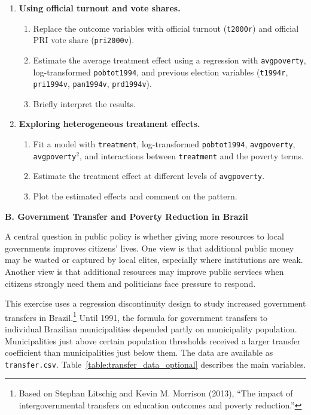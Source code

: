 \documentclass[12pt]{article}
\begin{document}
\begin{enumerate}
    \item \textbf{Using official turnout and vote shares.}
    \begin{enumerate}[label=(\alph*)]
        \item Replace the outcome variables with official turnout (\texttt{t2000r}) and official PRI vote share (\texttt{pri2000v}).
        \item Estimate the average treatment effect using a regression with \texttt{avgpoverty}, log-transformed \texttt{pobtot1994}, and previous election variables (\texttt{t1994r}, \texttt{pri1994v}, \texttt{pan1994v}, \texttt{prd1994v}).
        \item Briefly interpret the results.
    \end{enumerate}

    \item \textbf{Exploring heterogeneous treatment effects.}
    \begin{enumerate}[label=(\alph*)]
        \item Fit a model with \texttt{treatment}, log-transformed \texttt{pobtot1994}, \texttt{avgpoverty}, \texttt{avgpoverty}$^2$, and interactions between \texttt{treatment} and the poverty terms.
        \item Estimate the treatment effect at different levels of \texttt{avgpoverty}.
        \item Plot the estimated effects and comment on the pattern.
    \end{enumerate}
\end{enumerate}

\begin{center}
    \textbf{\large B. Government Transfer and Poverty Reduction in Brazil}
\end{center}

A central question in public policy is whether giving more resources to local governments improves citizens' lives. One view is that additional public money may be wasted or captured by local elites, especially where institutions are weak. Another view is that additional resources may improve public services when citizens strongly need them and politicians face pressure to respond.

This exercise uses a regression discontinuity design to study increased government transfers in Brazil.\footnote{Based on Stephan Litschig and Kevin M. Morrison (2013), ``The impact of intergovernmental transfers on education outcomes and poverty reduction.''} Until 1991, the formula for government transfers to individual Brazilian municipalities depended partly on municipality population. Municipalities just above certain population thresholds received a larger transfer coefficient than municipalities just below them. The data are available as \texttt{transfer.csv}. Table~\ref{table:transfer_data_optional} describes the main variables.
\end{document}

